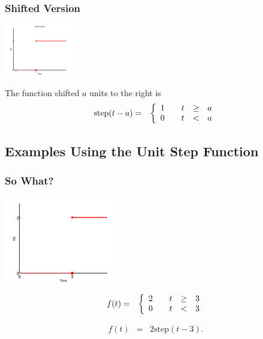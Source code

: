 \begin{frame}
  \frametitle{Shifted Version}

  \centerline{\includegraphics[width=3cm]{img/unitStepAta}}

    The function shifted $a$ units to the right is
    \begin{eqnarray*}
      \mathrm{step}(t-a) & = & 
      \left\{
        \begin{array}{r@{\hspace{2em}}rcl}
          1 & t & \geq & a \\
          0 & t & < & a
        \end{array}
      \right.
    \end{eqnarray*}


\end{frame}

\subsection{Examples Using the Unit Step Function}

\begin{frame}
  \frametitle{So What?}

  \centerline{\includegraphics[width=5cm]{img/stepEx1}}

  \begin{eqnarray*}
      f(t) & = & 
      \left\{
        \begin{array}{r@{\hspace{2em}}rcl}
          2 & t & \geq & 3 \\
          0 & t & < & 3
        \end{array}
      \right.
  \end{eqnarray*}

  {
    \begin{eqnarray*}
      f(t) & = & 2\mathrm{step}(t-3).
    \end{eqnarray*}
  }

\end{frame}


